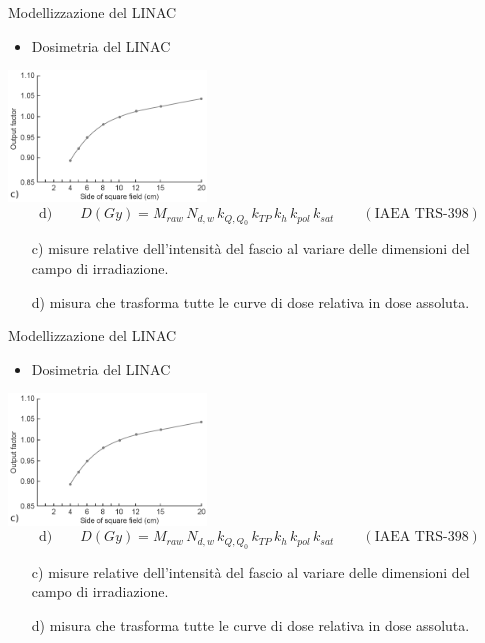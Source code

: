 \documentclass{beamer}
\begin{document}
\begin{frame}{Modellizzazione del LINAC}
\begin{itemize}
\scriptsize
{}
\item \alert{Dosimetria del LINAC}
\end{itemize}
\vspace{.75cm}
\centering
\includegraphics[height=3.5cm]{../cap2/of.png}
\scriptsize
$$\text{d)}\qquad D(Gy) = M_{raw}\,N_{d,w}\,k_{Q,Q_0}\,k_{TP}\,k_h\,k_{pol}\,k_{sat}\qquad (\textrm{IAEA TRS-398})$$
\begin{itemize}
\scriptsize
\item[c)]  misure relative dell'intensità del fascio al variare delle dimensioni del campo di irradiazione.
\item[d)]  misura che trasforma tutte le curve di dose relativa in dose assoluta.
\end{itemize}
\end{frame}



\begin{frame}{Modellizzazione del LINAC}
\begin{itemize}
\scriptsize
{}
\item \alert{Dosimetria del LINAC}
\end{itemize}
\vspace{.75cm}
\centering
\includegraphics[height=3.5cm]{../cap2/of.png}
\scriptsize
$$\text{d)}\qquad D(Gy) = M_{raw}\,N_{d,w}\,k_{Q,Q_0}\,k_{TP}\,k_h\,k_{pol}\,k_{sat}\qquad (\textrm{IAEA TRS-398})$$
\begin{itemize}
\scriptsize
\item[c)]  misure relative dell'intensità del fascio al variare delle dimensioni del campo di irradiazione.
\item[d)]  misura che trasforma tutte le curve di dose relativa in dose assoluta.
\end{itemize}
\end{frame}
\end{document}
